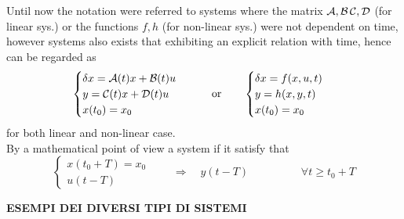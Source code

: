 	Until now the notation were referred to  systems where the matrix $\mathcal{A},\mathcal{B}\,\mathcal{C},\mathcal{D}$ (for linear sys.) or the functions $f,h$ (for non-linear sys.) were not dependent on time, however  systems also exists that exhibiting an explicit relation with time, hence can be regarded as
	\begin{equation}
		\begin{cases}
			\delta x = \mathcal{A}(t) x + \mathcal{B}(t) u \\ y = \mathcal{C}(t) x + \mathcal{D}(t) u \\ x(t_0) = x_0
		\end{cases}
		\qquad \textrm{or} \qquad 
		\begin{cases}
			\delta x = f(x,u,t) \\
			y = h(x,y,t) \\
			x(t_0) = x_0
		\end{cases}
	\end{equation}
	for both linear and non-linear case.\\
	By a mathematical point of view a system if it satisfy that
	\[ \begin{cases}
		x(t_0 + T) = x_0 \\ u(t-T) 
	\end{cases} \qquad \Rightarrow \quad y(t-T) \hspace{2cm} \forall t \geq t_0 + T \]
	
	\textbf{ESEMPI DEI DIVERSI TIPI DI SISTEMI}
	
